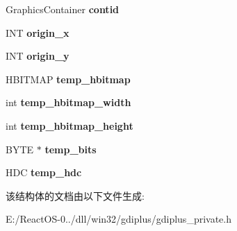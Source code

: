 \begin{DoxyCompactItemize}
Graphics\+Container {\bfseries contid}
\item 
\mbox{\label{struct_gp_graphics_ac1b974532314060fa0ba4b85141f44f1}} 
I\+NT {\bfseries origin\+\_\+x}
\item 
\mbox{\label{struct_gp_graphics_a622092632c241aba2993309ee521e3f7}} 
I\+NT {\bfseries origin\+\_\+y}
\item 
\mbox{\label{struct_gp_graphics_ac4c79e5a7dfa2747415ce4ac266a55d5}} 
H\+B\+I\+T\+M\+AP {\bfseries temp\+\_\+hbitmap}
\item 
\mbox{\label{struct_gp_graphics_a0e854729a1399802c5c82d3a63d3db0a}} 
int {\bfseries temp\+\_\+hbitmap\+\_\+width}
\item 
\mbox{\label{struct_gp_graphics_a71b4cb128050bb2e8e5ef8eff3e1db71}} 
int {\bfseries temp\+\_\+hbitmap\+\_\+height}
\item 
\mbox{\label{struct_gp_graphics_a20aeb7b761a8cf4eb737a9296459e2e2}} 
B\+Y\+TE $\ast$ {\bfseries temp\+\_\+bits}
\item 
\mbox{\label{struct_gp_graphics_af1107abadd0919b358eaa0e55973365f}} 
H\+DC {\bfseries temp\+\_\+hdc}
\end{DoxyCompactItemize}


该结构体的文档由以下文件生成\+:\begin{DoxyCompactItemize}
\item 
E\+:/\+React\+O\+S-\/0../dll/win32/gdiplus/gdiplus\+\_\+private.\+h\end{DoxyCompactItemize}
